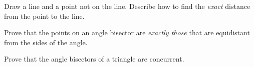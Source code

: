 \begin{prob}
Draw a line and a point not on the line.  Describe how to find the \emph{exact} distance from the point to the line. 
\end{prob}

\begin{prob}
Prove that the points on an angle bisector are \emph{exactly those} that are equidistant from the sides of the angle. 
\end{prob}

\begin{prob}
Prove that the angle bisectors of a triangle are concurrent. 
\end{prob}


